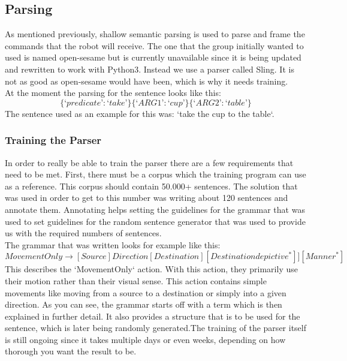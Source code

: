 \documentclass[main.tex]{subfiles}
\begin{document}
		
		\subsection{Parsing}
		As mentioned previously, shallow semantic parsing is used to parse and frame the commands that the robot will receive. The one that the group initially wanted to used is named open-sesame but is currently unavailable since it is being updated and rewritten to work with Python3. Instead we use a parser called Sling. It is not as good as open-sesame would have been, which is why it needs training.\\
		At the moment the parsing for the sentence looks like this:
		\begin{equation}
		\{‘predicate’: ‘take’\} \{‘ARG1’: ‘cup’\} \{‘ARG2’: ‘table’\}
		\end{equation}		
		The sentence used as an example for this was: ‘take the cup to the table‘.
		
		\subsubsection{Training the Parser}
		In order to really be able to train the parser there are a few requirements that need to be met. First, there must be a corpus which the training program can use as a reference. This corpus should contain 50.000+ sentences. The solution that was used in order to get to this number was writing about 120 sentences and annotate them. Annotating helps setting the guidelines for the grammar that was used to set guidelines for the random sentence generator that was used to provide us with the required numbers of sentences.\\
		The grammar that was written looks for example like this:
		\begin{equation}
		MovementOnly \rightarrow [Source]Direction[Destination][Destinationdepictive^*]][Manner^*]
		\end{equation}		
		This describes the ‘MovementOnly‘ action. With this action, they primarily use their motion rather than their visual sense. This action contains simple movements like moving from a source to a destination or simply into a given direction.
		As you can see, the grammar starts off with a term which is then explained in further detail. It also provides a structure that is to be used for the sentence, which is later being randomly generated.The training of the parser itself is still ongoing since it takes multiple days or even weeks, depending on how thorough you want the result to be.
		
\end{document}
